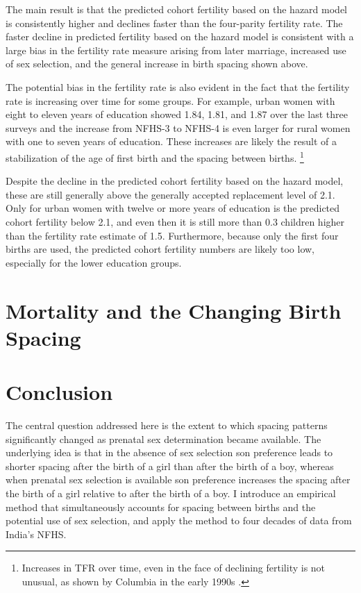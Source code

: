 \documentclass[12pt,letterpaper]{article}
\begin{document}
The main result is that the predicted cohort fertility based on the hazard model is 
consistently higher and declines faster than the four-parity fertility rate.
The faster decline in predicted fertility based on the hazard model is consistent with
a large bias in the fertility rate measure arising from later marriage, increased use of 
sex selection, and the general increase in birth spacing shown above.

The potential bias in the fertility rate is also evident in the fact that the 
fertility rate is increasing over time for some groups.
For example, urban women with eight to eleven years of education showed 1.84, 1.81, and
1.87 over the last three surveys and the increase from NFHS-3 to NFHS-4 is even larger
for rural women with one to seven years of education.
These increases are likely the result of a stabilization of the age of first birth and
the spacing between births.%
\footnote{
Increases in TFR over time, even in the face of declining fertility is not 
unusual, as shown by Columbia in the early 1990s \citep{Bongaarts1999}.
}

Despite the decline in the predicted cohort fertility based on the hazard model, these 
are still generally above the generally accepted replacement level of 2.1.
Only for urban women with twelve or more years of education is the predicted cohort
fertility below 2.1, and even then it is still more than 0.3 children higher than the 
fertility rate estimate of 1.5.
Furthermore, because only the first four births are used, the predicted cohort fertility
numbers are likely too low, especially for the lower education groups.


\section{Mortality and the Changing Birth Spacing\label{sec:mortality}}









\section{Conclusion\label{sec:conclusion}}


The central question addressed here is the extent to which spacing patterns significantly 
changed as prenatal sex determination became available.
The underlying idea is that in the absence of sex selection son preference leads to shorter 
spacing after the birth of a girl than after the birth of a boy, whereas when prenatal sex 
selection is available son preference increases the spacing after the birth of a girl 
relative to after the birth of a boy.
I introduce an empirical method that simultaneously accounts for spacing between births 
and the potential use of sex selection, and apply the method to four decades of data 
from India's NFHS.
\end{document}
